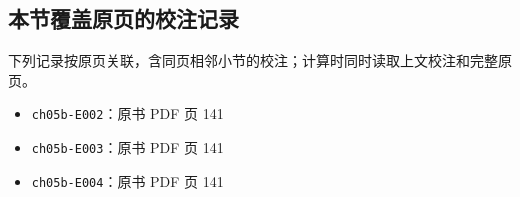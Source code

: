 \documentclass[
  10pt,
  fontset=fandol]{ctexart}
\providecommand{\tightlist}{%
  \setlength{\itemsep}{0pt}\setlength{\parskip}{0pt}}
\begin{document}
\subsection{本节覆盖原页的校注记录}\label{ux672cux8282ux8986ux76d6ux539fux9875ux7684ux6821ux6ce8ux8bb0ux5f55}

下列记录按原页关联，含同页相邻小节的校注；计算时同时读取上文校注和完整原页。

\begin{itemize}
\tightlist
\item
  \texttt{ch05b-E002}：原书 PDF 页 141
\item
  \texttt{ch05b-E003}：原书 PDF 页 141
\item
  \texttt{ch05b-E004}：原书 PDF 页 141
\end{itemize}
\end{document}
